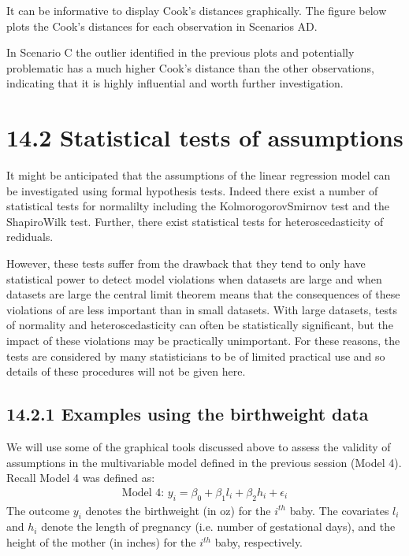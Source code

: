 \documentclass[letterpaper,10pt,english]{jupyterBook}
\let\sphinxpxdimen\pdfpxdimen\else\newdimen\sphinxpxdimen
\begin{document}
\sphinxAtStartPar
It can be informative to display Cook’s distances graphically. The figure below plots the Cook’s distances for each observation in Scenarios A\sphinxhyphen{}D.

\begin{figure}[htbp]
\centering

\noindent\sphinxincludegraphics[height=600\sphinxpxdimen]{{cooks_distance}.png}
\end{figure}

\sphinxAtStartPar
In Scenario C the outlier identified in the previous plots and potentially problematic has a much higher Cook’s distance than the other observations, indicating that it is highly influential and worth further investigation.


\section{14.2 Statistical tests of assumptions}
\label{\detokenize{14.d. Linear Regression III:statistical-tests-of-assumptions}}\label{\detokenize{14.d. Linear Regression III::doc}}
\sphinxAtStartPar
It might be anticipated that the assumptions of the linear regression model can be investigated using formal hypothesis tests. Indeed there exist a number of statistical tests for normalilty including the Kolmorogorov\sphinxhyphen{}Smirnov test and the Shapiro\sphinxhyphen{}Wilk test. Further, there exist statistical tests for heteroscedasticity of rediduals.

\sphinxAtStartPar
However, these tests suffer from the drawback that they tend to only have statistical power to detect model violations when datasets are large and when datasets are large the central limit theorem means that the consequences of these violations of are less important than in small datasets. With large datasets, tests of normality and heteroscedasticity can often be statistically significant, but the impact of these violations may be practically unimportant. For these reasons, the tests are considered by many statisticians to be of limited practical use and so details of these procedures will not be given here.


\subsection{14.2.1 Examples using the birthweight data}
\label{\detokenize{14.d. Linear Regression III:examples-using-the-birthweight-data}}
\sphinxAtStartPar
We will use some of the graphical tools discussed above to assess the validity of assumptions in the multivariable model defined in the previous session (Model 4). Recall Model 4 was defined as:
\begin{equation*}
\begin{split}
\text{Model 4: } y_i = \beta_0 + \beta_1 l_i + \beta_2h_i + \epsilon_i 
\end{split}
\end{equation*}
\sphinxAtStartPar
The outcome \(y_i\) denotes the birthweight (in oz) for the \(i^{th}\) baby. The covariates \(l_i\) and \(h_i\) denote the length of pregnancy (i.e. number of gestational days), and the height of the mother (in inches) for the \(i^{th}\) baby, respectively.
\end{document}
